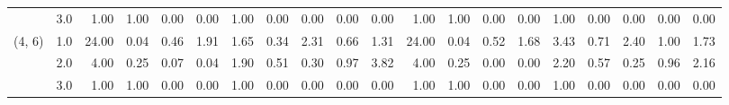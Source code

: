 \begin{tabular}{llrrrrrrrrrrrrrrrrrr}
       & 3.0 &               1.00 &                     1.00 &                                 0.00 &                             0.00 &                           1.00 &                                               0.00 &                                            0.00 &                                            0.00 &                                        0.00 &               1.00 &                     1.00 &                                 0.00 &                             0.00 &                           1.00 &                                               0.00 &                                            0.00 &                                            0.00 &                                        0.00 \\
(4, 6) & 1.0 &              24.00 &                     0.04 &                                 0.46 &                             1.91 &                           1.65 &                                               0.34 &                                            2.31 &                                            0.66 &                                        1.31 &              24.00 &                     0.04 &                                 0.52 &                             1.68 &                           3.43 &                                               0.71 &                                            2.40 &                                            1.00 &                                        1.73 \\
       & 2.0 &               4.00 &                     0.25 &                                 0.07 &                             0.04 &                           1.90 &                                               0.51 &                                            0.30 &                                            0.97 &                                        3.82 &               4.00 &                     0.25 &                                 0.00 &                             0.00 &                           2.20 &                                               0.57 &                                            0.25 &                                            0.96 &                                        2.16 \\
       & 3.0 &               1.00 &                     1.00 &                                 0.00 &                             0.00 &                           1.00 &                                               0.00 &                                            0.00 &                                            0.00 &                                        0.00 &               1.00 &                     1.00 &                                 0.00 &                             0.00 &                           1.00 &                                               0.00 &                                            0.00 &                                            0.00 &                                        0.00 \\

\end{tabular}

